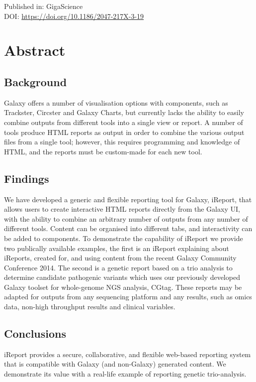 Published in: GigaScience \\
DOI: \url{https://doi.org/10.1186/2047-217X-3-19} \\

\section*{Abstract}

\subsection{Background}
Galaxy offers a number of visualisation options with components, such as Trackster, Circster and Galaxy Charts, but currently lacks the ability to easily combine outputs from different tools into a single view or report. A number of tools produce HTML reports as output in order to combine the various output files from a single tool; however, this requires programming and knowledge of HTML, and the reports must be custom-made for each new tool.

\subsection{Findings}
We have developed a generic and flexible reporting tool for Galaxy, iReport, that allows users to create interactive HTML reports directly from the Galaxy UI, with the ability to combine an arbitrary number of outputs from any number of different tools. Content can be organised into different tabs, and interactivity can be added to components. To demonstrate the capability of iReport we provide two publically available examples, the first is an iReport explaining about iReports, created for, and using content from the recent Galaxy Community Conference 2014. The second is a genetic report based on a trio analysis to determine candidate pathogenic variants which uses our previously developed Galaxy toolset for whole-genome NGS analysis, CGtag. These reports may be adapted for outputs from any sequencing platform and any results, such as omics data, non-high throughput results and clinical variables.

\subsection{Conclusions}
iReport provides a secure, collaborative, and flexible web-based reporting system that is compatible with Galaxy (and non-Galaxy) generated content. We demonstrate its value with a real-life example of reporting genetic trio-analysis.


